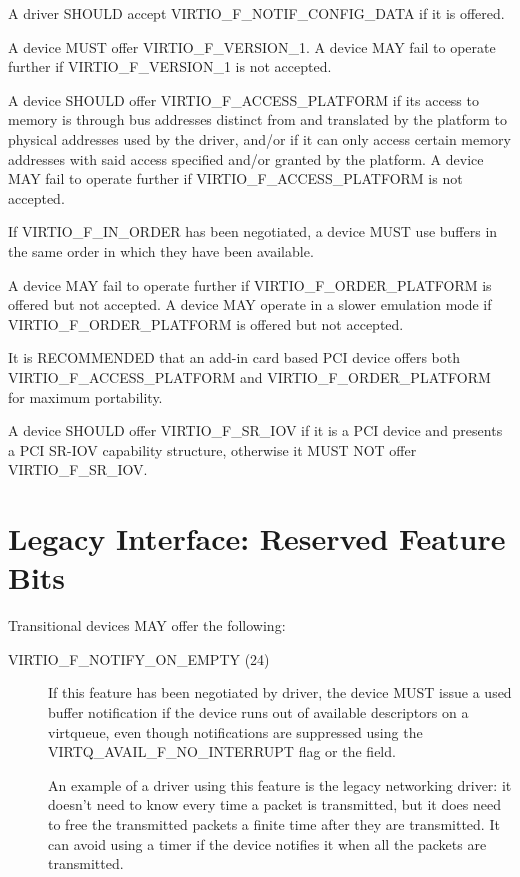 A driver SHOULD accept VIRTIO_F_NOTIF_CONFIG_DATA if it is offered.


A device MUST offer VIRTIO_F_VERSION_1.  A device MAY fail to operate further
if VIRTIO_F_VERSION_1 is not accepted.

A device SHOULD offer VIRTIO_F_ACCESS_PLATFORM if its access to
memory is through bus addresses distinct from and translated
by the platform to physical addresses used by the driver, and/or
if it can only access certain memory addresses with said access
specified and/or granted by the platform.
A device MAY fail to operate further if VIRTIO_F_ACCESS_PLATFORM is not
accepted.

If VIRTIO_F_IN_ORDER has been negotiated, a device MUST use
buffers in the same order in which they have been available.

A device MAY fail to operate further if
VIRTIO_F_ORDER_PLATFORM is offered but not accepted.
A device MAY operate in a slower emulation mode if
VIRTIO_F_ORDER_PLATFORM is offered but not accepted.

It is RECOMMENDED that an add-in card based PCI device
offers both VIRTIO_F_ACCESS_PLATFORM and
VIRTIO_F_ORDER_PLATFORM for maximum portability.

A device SHOULD offer VIRTIO_F_SR_IOV if it is a PCI device
and presents a PCI SR-IOV capability structure, otherwise
it MUST NOT offer VIRTIO_F_SR_IOV.

\section{Legacy Interface: Reserved Feature Bits}\label{sec:Reserved Feature Bits / Legacy Interface: Reserved Feature Bits}

Transitional devices MAY offer the following:
\begin{description}
\item[VIRTIO_F_NOTIFY_ON_EMPTY (24)] If this feature
  has been negotiated by driver, the device MUST issue
  a used buffer notification if the device runs
  out of available descriptors on a virtqueue, even though
  notifications are suppressed using the VIRTQ_AVAIL_F_NO_INTERRUPT
  flag or the  field.
\begin{note}
  An example of a driver using this feature is the legacy
  networking driver: it doesn't need to know every time a packet
  is transmitted, but it does need to free the transmitted
  packets a finite time after they are transmitted. It can avoid
  using a timer if the device notifies it when all the packets
  are transmitted.
\end{note}
\end{description}

